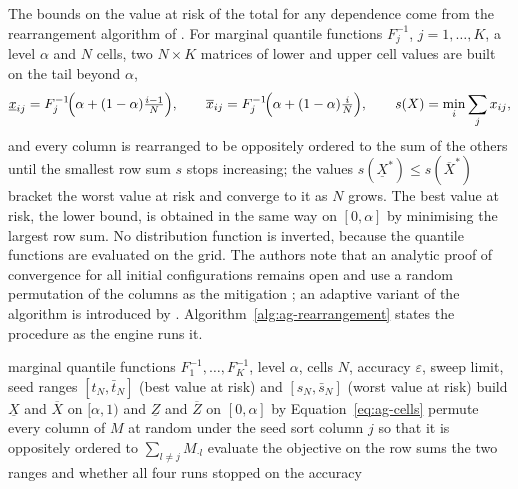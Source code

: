 The bounds on the value at risk of the total for any dependence come from the rearrangement algorithm of
\citet{aggregation-stress:embrechts2013}. For marginal quantile functions $F_j^{-1}$, $j=1,\dots,K$, a level $\alpha$ and $N$
cells, two $N\times K$ matrices of lower and upper cell values are built on the tail beyond $\alpha$,
\begin{equation}
\underline{x}_{ij}=F_j^{-1}\!\Bigl(\alpha+(1-\alpha)\tfrac{i-1}{N}\Bigr),\qquad
\overline{x}_{ij}=F_j^{-1}\!\Bigl(\alpha+(1-\alpha)\tfrac{i}{N}\Bigr),\qquad
s(X)=\min_i\sum_{j}x_{ij},
\label{eq:ag-cells}
\end{equation}
and every column is rearranged to be oppositely ordered to the sum of the others until the smallest row sum $s$ stops
increasing; the values $s(\underline{X}^{*})\le s(\overline{X}^{*})$ bracket the worst value at risk and converge to it as $N$
grows. The best value at risk, the lower bound, is obtained in the same way on $[0,\alpha]$ by minimising the largest row sum.
No distribution function is inverted, because the quantile functions are evaluated on the grid. The authors note that an
analytic proof of convergence for all initial configurations remains open and use a random permutation of the columns as the
mitigation \citep{aggregation-stress:embrechts2013}; an adaptive variant of the algorithm is introduced by
\citet{aggregation-stress:hofert2015}. Algorithm~\ref{alg:ag-rearrangement} states the procedure as the engine runs it.

\begin{algorithm}[htbp]
\caption{Rearrangement bounds on the value at risk of the total (lower and upper ranges).}
\label{alg:ag-rearrangement}
\begin{algorithmic}[1]
\Require marginal quantile functions $F_1^{-1},\dots,F_K^{-1}$, level $\alpha$, cells $N$, accuracy $\varepsilon$, sweep limit, seed
\Ensure ranges $[t_N,\bar t_N]$ (best value at risk) and $[s_N,\bar s_N]$ (worst value at risk)
\State build $\underline{X}$ and $\overline{X}$ on $[\alpha,1)$ and $\underline{Z}$ and $\overline{Z}$ on $[0,\alpha]$ by Equation~\eqref{eq:ag-cells}
  \State permute every column of $M$ at random under the seed
  \Repeat
      \State sort column $j$ so that it is oppositely ordered to $\sum_{l\neq j}M_{\cdot l}$
    \EndFor
    \State evaluate the objective on the row sums
\EndFor
\State \Return the two ranges and whether all four runs stopped on the accuracy
\end{algorithmic}
\end{algorithm}

